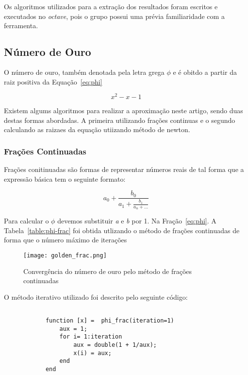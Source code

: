 	Os algoritmos utilizados para a extração dos resultados foram escritos e
	executados no \emph{octave}, pois o grupo possui uma prévia familiaridade
	com a ferramenta. 
	
	\subsection{Número de Ouro}
		
		O número de ouro, também denotada pela letra grega $\phi$ e é obitdo a
		partir da raiz positiva da Equação~\ref{eq:phi}

		\begin{equation}
			x^2-x-1
		\label{eq:phi}
		\end{equation}

		Existem algums algoritmos para realizar a aproximação neste artigo,
		sendo duas destas formas  abordadas. A primeira utilizando frações
		continuas e o segundo calculando as raizaes da equação utiizando método
		de newton.

		\subsubsection{Frações Continuadas}

			Frações conitinuadas são formas de representar números reais de tal
			forma que a expressão básica tem o seguinte formato:

			\begin{equation}
			\label{eq:phi-frac}
				a_0 + \frac{b_0}{a_1 + \frac{b_1}{a_n + \dots}}
			\end{equation}

			Para calcular o $\phi$ devemos substituir \emph{a} e \emph{b}
			por 1. Na Fração~\ref{eq:phi}. A Tabela~\ref{table:phi-frac}
			foi obtida utlizando o método de frações continuadas de forma
			que o número máximo de iterações  

			


			\begin{figure}[H]
				\centering
				\texttt{[image: golden\_frac.png]}
				\caption{Convergência do número de ouro pelo método de frações continuadas}
				\label{golden_frac}
			\end{figure}


			O método iterativo utilizado foi descrito pelo seguinte código:

			\begin{lstlisting}

			function [x] =  phi_frac(iteration=1)
				aux = 1;
				for i= 1:iteration
					aux = double(1 + 1/aux);
					x(i) = aux;
				end
			end

			\end{lstlisting}

